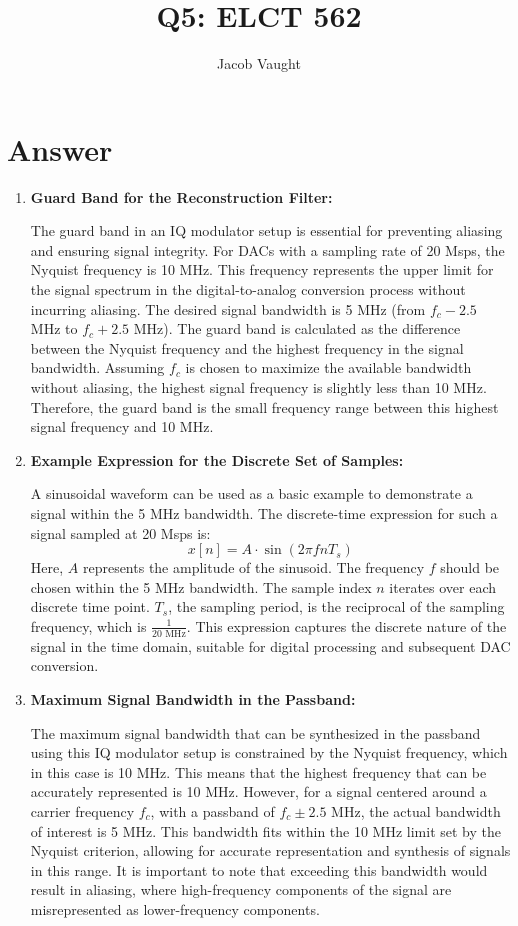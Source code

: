 \documentclass[12pt]{article}
\begin{document}
\title{Q5: ELCT 562}
\author{Jacob Vaught}
\date{}
\maketitle

\section*{Answer}

\begin{enumerate}
    \item \textbf{Guard Band for the Reconstruction Filter:}

    The guard band in an IQ modulator setup is essential for preventing aliasing and ensuring signal integrity. For DACs with a sampling rate of 20 Msps, the Nyquist frequency is 10 MHz. This frequency represents the upper limit for the signal spectrum in the digital-to-analog conversion process without incurring aliasing. The desired signal bandwidth is 5 MHz (from \( f_c - 2.5 \) MHz to \( f_c + 2.5 \) MHz). The guard band is calculated as the difference between the Nyquist frequency and the highest frequency in the signal bandwidth. Assuming \( f_c \) is chosen to maximize the available bandwidth without aliasing, the highest signal frequency is slightly less than 10 MHz. Therefore, the guard band is the small frequency range between this highest signal frequency and 10 MHz.

    \item \textbf{Example Expression for the Discrete Set of Samples:}

    A sinusoidal waveform can be used as a basic example to demonstrate a signal within the 5 MHz bandwidth. The discrete-time expression for such a signal sampled at 20 Msps is:
    \[ x[n] = A \cdot \sin(2 \pi f n T_s) \]
    Here, \( A \) represents the amplitude of the sinusoid. The frequency \( f \) should be chosen within the 5 MHz bandwidth. The sample index \( n \) iterates over each discrete time point. \( T_s \), the sampling period, is the reciprocal of the sampling frequency, which is \( \frac{1}{20 \text{ MHz}} \). This expression captures the discrete nature of the signal in the time domain, suitable for digital processing and subsequent DAC conversion.

    \item \textbf{Maximum Signal Bandwidth in the Passband:}

    The maximum signal bandwidth that can be synthesized in the passband using this IQ modulator setup is constrained by the Nyquist frequency, which in this case is 10 MHz. This means that the highest frequency that can be accurately represented is 10 MHz. However, for a signal centered around a carrier frequency \( f_c \), with a passband of \( f_c \pm 2.5 \) MHz, the actual bandwidth of interest is 5 MHz. This bandwidth fits within the 10 MHz limit set by the Nyquist criterion, allowing for accurate representation and synthesis of signals in this range. It is important to note that exceeding this bandwidth would result in aliasing, where high-frequency components of the signal are misrepresented as lower-frequency components.
\end{enumerate}
\end{document}
